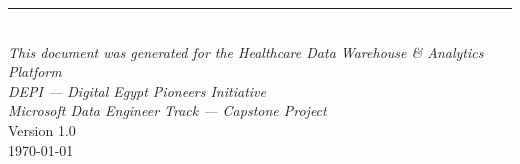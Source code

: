 \documentclass[12pt, a4paper, oneside]{report}
\begin{document}
\printindex



\vfill
\begin{center}
    \rule{0.5\textwidth}{0.4pt}\\[10pt]
    \textit{This document was generated for the Healthcare Data Warehouse \& Analytics Platform}\\
    \textit{DEPI --- Digital Egypt Pioneers Initiative}\\
    \textit{Microsoft Data Engineer Track --- Capstone Project}\\[5pt]
    {\small Version 1.0}\\
    \small{\today}
\end{center}
\end{document}
